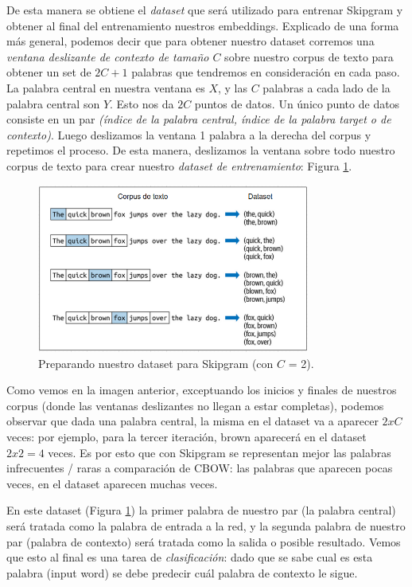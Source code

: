 \documentclass[12pt,a4paper]{article}
\begin{document}
\begin{sloppypar}
De esta manera se obtiene el \textit{dataset} que será utilizado para entrenar Skipgram y obtener al final del entrenamiento nuestros embeddings. Explicado de una forma más general, podemos decir que para obtener nuestro dataset corremos una \textit{ventana deslizante de contexto de tamaño $C$} sobre nuestro corpus de texto para obtener un set de $2C+1$ palabras que tendremos en consideración en cada paso. La palabra central en nuestra ventana es $X$, y las $C$ palabras a cada lado de la palabra central son $Y$. Esto nos da $2C$ puntos de datos. Un único punto de datos consiste en un par \textit{(índice de la palabra central, índice de la palabra target o de contexto)}. Luego deslizamos la ventana 1 palabra a la derecha del corpus y repetimos el proceso. De esta manera, deslizamos la ventana sobre todo nuestro corpus de texto para crear nuestro \textit{dataset de entrenamiento}: Figura \ref{fig:Imagen_NLP_21}. 

\begin{figure}[H]    
 \centering
 \includegraphics[width=0.8\textwidth]{images/NLP/21.png}
 \captionsetup{justification=centering,margin=4cm}
 \caption{Preparando nuestro dataset para Skipgram (con $C$ = 2)\cite{NLP_26}.}
 \label{fig:Imagen_NLP_21}
\end{figure}

Como vemos en la imagen anterior, exceptuando los inicios y finales de nuestros corpus (donde las ventanas deslizantes no llegan a estar completas), podemos observar que dada una palabra central, la misma en el dataset va a aparecer $2xC$ veces: por ejemplo, para la tercer iteración, brown aparecerá en el dataset $2x2=4$ veces. Es por esto que con Skipgram se representan mejor las palabras infrecuentes / raras a comparación de CBOW: las palabras que aparecen pocas veces, en el dataset aparecen muchas veces.

En este dataset (Figura \ref{fig:Imagen_NLP_21}) la primer palabra de nuestro par (la palabra central) será tratada como la palabra de entrada a la red, y la segunda palabra de nuestro par (palabra de contexto) será tratada como la salida o posible resultado. Vemos que esto al final es una tarea de \textit{clasificación}: dado que se sabe cual es esta palabra (input word) se debe predecir cuál palabra de contexto le sigue.


\end{sloppypar}
\end{document}
